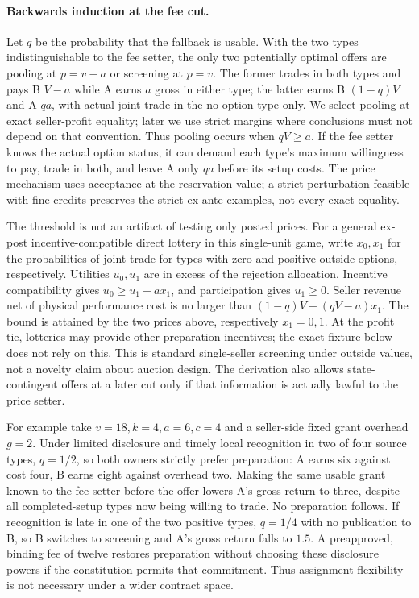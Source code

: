 \documentclass{article}
\begin{document}
\paragraph{Backwards induction at the fee cut.}
Let $q$ be the probability that the fallback is usable. With the two types indistinguishable to the fee setter, the only two potentially optimal offers are pooling at $p=v-a$ or screening at $p=v$. The former trades in both types and pays B $V-a$ while A earns $a$ gross in either type; the latter earns B $(1-q)V$ and A $qa$, with actual joint trade in the no-option type only. We select pooling at exact seller-profit equality; later we use strict margins where conclusions must not depend on that convention. Thus pooling occurs when $qV\ge a$. If the fee setter knows the actual option status, it can demand each type's maximum willingness to pay, trade in both, and leave A only $qa$ before its setup costs. The price mechanism uses acceptance at the reservation value; a strict perturbation feasible with fine credits preserves the strict ex ante examples, not every exact equality.

The threshold is not an artifact of testing only posted prices. For a general ex-post incentive-compatible direct lottery in this single-unit game, write $x_0,x_1$ for the probabilities of joint trade for types with zero and positive outside options, respectively. Utilities $u_0,u_1$ are in excess of the rejection allocation. Incentive compatibility gives $u_0\ge u_1+a x_1$, and participation gives $u_1\ge0$. Seller revenue net of physical performance cost is no larger than $(1-q)V+(qV-a)x_1$. The bound is attained by the two prices above, respectively $x_1=0,1$. At the profit tie, lotteries may provide other preparation incentives; the exact fixture below does not rely on this. This is standard single-seller screening under outside values, not a novelty claim about auction design. The derivation also allows state-contingent offers at a later cut only if that information is actually lawful to the price setter.

For example take $v=18,k=4,a=6,c=4$ and a seller-side fixed grant overhead $g=2$. Under limited disclosure and timely local recognition in two of four source types, $q=1/2$, so both owners strictly prefer preparation: A earns six against cost four, B earns eight against overhead two. Making the same usable grant known to the fee setter before the offer lowers A's gross return to three, despite all completed-setup types now being willing to trade. No preparation follows. If recognition is late in one of the two positive types, $q=1/4$ with no publication to B, so B switches to screening and A's gross return falls to $1.5$. A preapproved, binding fee of twelve restores preparation without choosing these disclosure powers if the constitution permits that commitment. Thus assignment flexibility is not necessary under a wider contract space.
\end{document}
